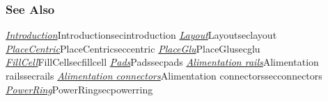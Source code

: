\begin{htmlonly}

\subsubsection{See Also}

\hyperref[ref]{\emph{Introduction}}{}{Introduction}{secintroduction}
\hyperref[ref]{\emph{Layout}}{}{Layout}{seclayout}
\hyperref[ref]{\emph{PlaceCentric}}{}{PlaceCentric}{seccentric}
\hyperref[ref]{\emph{PlaceGlu}}{}{PlaceGlu}{secglu}
\hyperref[ref]{\emph{FillCell}}{}{FillCell}{secfillcell}
\hyperref[ref]{\emph{Pads}}{}{Pads}{secpads}
\hyperref[ref]{\emph{Alimentation rails}}{}{Alimentation rails}{secrails}
\hyperref[ref]{\emph{Alimentation connectors}}{}{Alimentation connectors}{secconnectors}
\hyperref[ref]{\emph{PowerRing}}{}{PowerRing}{secpowerring}

\end{htmlonly}
